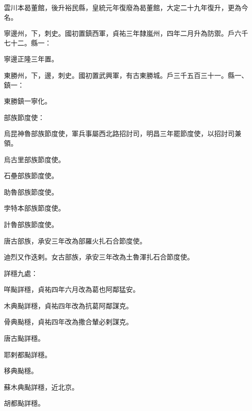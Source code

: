 \begin{pinyinscope}
 雲川本曷董館，後升裕民縣，皇統元年復廢為曷董館，大定二十九年復升，更為今名。



 寧邊州，下，刺史。國初置鎮西軍，貞祐三年隸嵐州，四年二月升為防禦。戶六千七十二。縣一：



 寧邊正隆三年置。



 東勝州，下，邊，刺史。國初置武興軍，有古東勝城。戶三千五百三十一。縣一、鎮一：



 東勝鎮一寧化。



 部族節度使：



 烏昆神魯部族節度使，軍兵事屬西北路招討司，明昌三年罷節度使，以招討司兼領。



 烏古里部族節度使。



 石壘部族節度使。



 助魯部族節度使。



 孛特本部族節度使。



 計魯部族節度使。



 唐古部族，承安三年改為部羅火扎石合節度使。



 迪烈又作迭剌。女古部族，承安三年改為土魯渾扎石合節度使。



 詳穩九處：



 咩颭詳穩，貞祐四年六月改為葛也阿鄰猛安。



 木典颭詳穩，貞祐四年改為抗葛阿鄰謀克。



 骨典颭穩，貞祐四年改為撒合輦必剌謀克。



 唐古颭詳穩。



 耶剌都颭詳穩。



 移典颭穩。



 蘇木典颭詳穩，近北京。



 胡都颭詳穩。




\end{pinyinscope}
